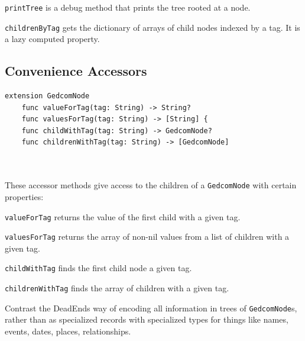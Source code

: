 \texttt{printTree} is a debug method that prints the tree rooted at a node.

\texttt{childrenByTag} gets the dictionary of arrays of child nodes
indexed by a tag. It is a lazy computed property.
\subsection{Convenience Accessors}

\begin{verbatim}
extension GedcomNode
    func valueForTag(tag: String) -> String?
    func valuesForTag(tag: String) -> [String] {
    func childWithTag(tag: String) -> GedcomNode?
    func childrenWithTag(tag: String) -> [GedcomNode]
    
	
\end{verbatim}

These accessor methods give access to the children of a
\texttt{GedcomNode} with certain properties:

\texttt{valueForTag} returns the value of the first child with a given tag.

\texttt{valuesForTag} returns the array of non-nil values from a list of children with a given tag.

\texttt{childWithTag} finds the first child node a given tag.

\texttt{childrenWithTag} finds the array of children with a given tag.

Contrast the DeadEnds way of encoding all information in trees of
\texttt{GedcomNode}s, rather than as specialized records with specialized
types for things like names, events, dates, places, relationships.



